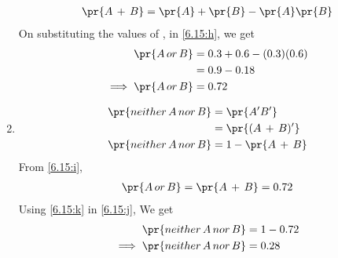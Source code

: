 \begin{enumerate}[label={\roman*)}]
\begin{align}
    \pr{A\,+\,B} = \pr{A} + \pr{B} -\pr{A}\pr{B}\label{6.15:h}
\end{align}
On substituting the values of , in \eqref{6.15:h}, we get
\begin{align}
    \pr{A\,or\,B} &= 0.3 + 0.6 -(0.3)(0.6)\\
    &= 0.9-0.18\\
    \implies \pr{A\,or\,B} &= 0.72\label{6.15:i}
\end{align}
\item
\begin{align}
    \pr{neither\, A\, nor\, B} &= \pr{A'B'}\\
    &=\pr{(A\,+\,B)'}\\
    \pr{neither\, A\, nor\, B}&=1-\pr{A\,+\,B}\label{6.15:j}
\end{align}
From \eqref{6.15:i},
\begin{align}
    \pr{A\,or\,B} =\pr{A\,+\,B}=0.72\label{6.15:k}
\end{align}
Using \eqref{6.15:k} in \eqref{6.15:j}, We get
\begin{align}
    \pr{neither\, A\, nor\, B}&=1-0.72\\
   \implies \pr{neither\, A\, nor\, B}&=0.28
\end{align}
\end{enumerate}